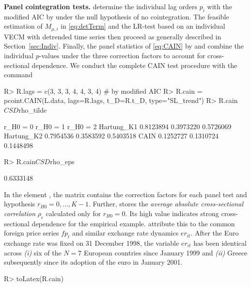 \textbf{Panel cointegration tests.} \citet{ArsovaOersal2016} determine the individual lag orders $ p_i $ with the modified AIC by \citet{QuPerron2007} under the null hypothesis of no cointegration. The feasible estimation of $ M_{\mu,i} $ in \eqref{eq:detTerm} and the LR-test based on an individual VECM with detrended time series then proceed as generally described in Section~\ref{sec:Indiv}. Finally, the panel statistics of \eqref{eq:CAIN} by \citet{Hartung1999} and \citet{ArsovaOersal2021} combine the individual $ p $-values under the three correction factors to account for cross-sectional dependence. We conduct the complete CAIN test procedure with the  command
\begin{CodeChunk}
\begin{CodeInput}
R> R.lags = c(3, 3, 3, 4, 4, 3, 4)  # by modified AIC
R> R.cain = pcoint.CAIN(L.data, lags=R.lags, t_D=R.t_D, type="SL_trend")
R> R.cain$CSD$rho_tilde
\end{CodeInput}
\begin{CodeOutput}
            r_H0 = 0  r_H0 = 1  r_H0 = 2
Hartung_K1 0.8123894 0.3973220 0.5726069
Hartung_K2 0.7954536 0.3583592 0.5403518
CAIN       0.1252727 0.1310724 0.1448498
\end{CodeOutput}
\begin{CodeInput}
R> R.cain$CSD$rho_eps
\end{CodeInput}
\begin{CodeOutput}
[1] 0.6333148
\end{CodeOutput}
\end{CodeChunk}
In the element , the matrix  contains the correction factors for each panel test and hypothesis $ r_{H0} = 0,\ldots,K-1  $. Further,  stores the \textit{average absolute cross-sectional correlation} $ \rho_\epsilon $ calculated only for $ r_{H0} = 0 $. Its high value indicates strong cross-sectional dependence for the empirical example. \citet[p.~15]{ArsovaOersal2016} attribute this to the common foreign price series $ f\!p_{t} $ and similar exchange rate dynamics $ e\!r_{it} $. After the Euro exchange rate was fixed on 31 December 1998, the variable $ e\!r_{it} $ has been identical across \textit{(i)} six of the $ N=7 $ European countries since January 1999 and \textit{(ii)} Greece subsequently since its adoption of the euro in January 2001.
\begin{CodeChunk}
\begin{CodeInput}
R> toLatex(R.cain)
\end{CodeInput}
\end{CodeChunk}
